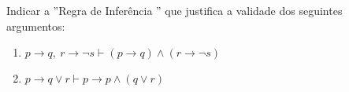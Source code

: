 \item
	Indicar a ''{{\sc Regra de Inferência }}'' que justifica a validade dos seguintes argumentos:
		\begin{enumerate}
				\item $p\to q,\ r\to \neg s \vdash (p\to q)\wedge (r\to \neg s)$
				\item $p \to q \vee r \vdash p \to p\wedge  ( q \vee r)$
		\end{enumerate}

